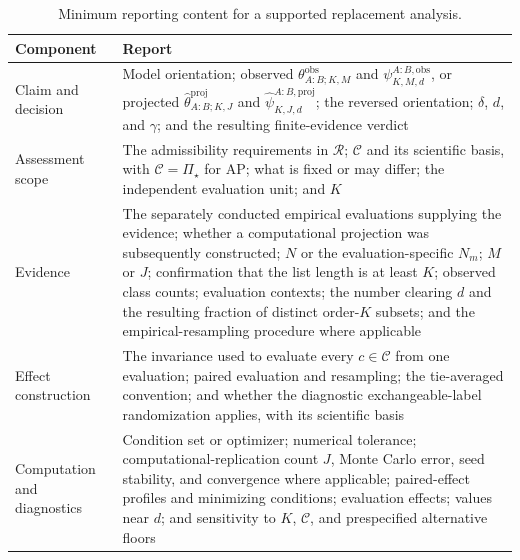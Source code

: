 \documentclass[11pt]{article}
\newcommand{\Regime}{\mathcal{R}}
\newcommand{\CSet}{\mathcal{C}}
\newcommand{\PSet}{\Pi_\star}
\theoremstyle{remark}
\begin{document}
\begin{table}[ht]
\centering
\caption{Minimum reporting content for a supported replacement analysis.}
\label{tab:reporting}
\begin{tabularx}{\textwidth}{@{}p{}>{\raggedright\arraybackslash}X@{}}
\toprule
Component & Report \\
\midrule
Claim and decision &
Model orientation; observed $\theta_{A:B;K,M}^{\mathrm{obs}}$ and $\psi_{K,M,d}^{A:B,\mathrm{obs}}$, or projected $\widehat\theta_{A:B;K,J}^{\mathrm{proj}}$ and $\widehat\psi_{K,J,d}^{A:B,\mathrm{proj}}$; the reversed orientation; $\delta$, $d$, and $\gamma$; and the resulting finite-evidence verdict \\
Assessment scope &
The admissibility requirements in $\Regime$; $\CSet$ and its scientific basis, with $\CSet=\PSet$ for AP; what is fixed or may differ; the independent evaluation unit; and $K$ \\
Evidence &
The separately conducted empirical evaluations supplying the evidence; whether a computational projection was subsequently constructed; $N$ or the evaluation-specific $N_m$; $M$ or $J$; confirmation that the list length is at least $K$; observed class counts; evaluation contexts; the number clearing $d$ and the resulting fraction of distinct order-$K$ subsets; and the empirical-resampling procedure where applicable \\
Effect construction &
The invariance used to evaluate every $c\in\CSet$ from one evaluation; paired evaluation and resampling; the tie-averaged convention; and whether the diagnostic exchangeable-label randomization applies, with its scientific basis \\
Computation and diagnostics &
Condition set or optimizer; numerical tolerance; computational-replication count $J$, Monte Carlo error, seed stability, and convergence where applicable; paired-effect profiles and minimizing conditions; evaluation effects; values near $d$; and sensitivity to $K$, $\CSet$, and prespecified alternative floors \\
\bottomrule
\end{tabularx}
\end{table}
\end{document}
